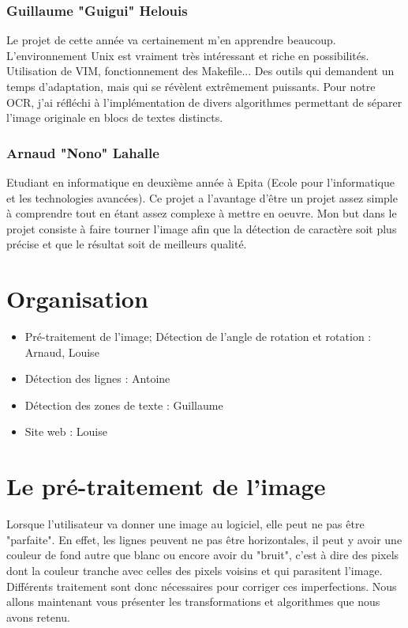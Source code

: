 \documentclass [french,12pt]{article}
\begin{document}
\subsubsection{Guillaume "Guigui" Helouis}

Le projet de cette année va certainement m'en apprendre beaucoup. 
L'environnement Unix est vraiment très intéressant et riche en possibilités.
\\
Utilisation de VIM, fonctionnement des Makefile... Des outils qui demandent un temps d'adaptation, mais qui se révèlent extrêmement puissants.
Pour notre OCR, j'ai réfléchi à l'implémentation de divers algorithmes permettant de séparer l'image originale en blocs de textes distincts.


\subsubsection{Arnaud "Nono" Lahalle}
Etudiant en informatique en deuxième année à Epita (Ecole pour l'informatique et les technologies avancées).
Ce projet a l'avantage d'être un projet assez simple à comprendre tout en étant assez complexe à mettre en oeuvre.  
Mon but dans le projet consiste à faire tourner l'image afin que la détection de caractère soit plus précise et que le résultat soit de meilleurs qualité.


\section{Organisation}
\begin{itemize}
\item{Pré-traitement de l'image; Détection de l'angle de rotation et rotation : Arnaud,  Louise}
\item{Détection des lignes : Antoine}
\item{Détection des zones de texte : Guillaume}
\item{Site web : Louise}
\end{itemize}

\section{Le pré-traitement de l'image}

Lorsque l'utilisateur va donner une image au logiciel, elle peut ne pas être "parfaite". En effet, les lignes peuvent ne pas être horizontales, il peut y avoir une couleur de fond autre que blanc ou encore avoir du "bruit", c'est à dire des pixels dont la couleur tranche avec celles des pixels voisins et qui parasitent l'image. Différents traitement sont donc nécessaires pour corriger ces imperfections.
Nous allons maintenant vous présenter les transformations et algorithmes que nous avons retenu.
\end{document}
